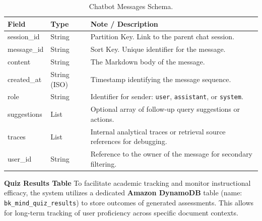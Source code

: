 \begin{table}[H]
    \centering
    \caption{Chatbot Messages Schema.}
    \label{tab:chat_messages}
    \begin{tabular}{llp{8cm}}
        \toprule
        \textbf{Field} & \textbf{Type} & \textbf{Note / Description} \\
        \midrule
        session\_id & String & Partition Key. Link to the parent chat session. \\
        message\_id & String & Sort Key. Unique identifier for the message. \\
        \midrule
        content & String & The Markdown body of the message. \\
        created\_at & String (ISO) & Timestamp identifying the message sequence. \\
        role & String & Identifier for sender: \texttt{user}, \texttt{assistant}, or \texttt{system}. \\
        suggestions & List & Optional array of follow-up query suggestions or actions. \\
        traces & List & Internal analytical traces or retrieval source references for debugging. \\
        user\_id & String & Reference to the owner of the message for secondary filtering. \\
        \bottomrule
    \end{tabular}
\end{table}

\newpage

\textbf{Quiz Results Table}
To facilitate academic tracking and monitor instructional efficacy, the system utilizes a dedicated \textbf{Amazon DynamoDB} table (name: \texttt{bk\_mind\_quiz\_results}) to store outcomes of generated assessments. This allows for long-term tracking of user proficiency across specific document contexts.

